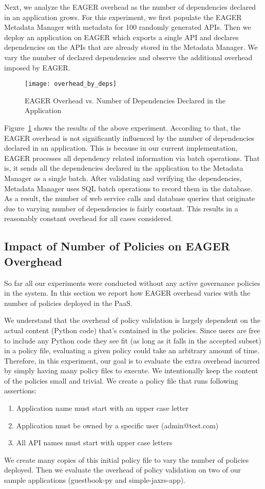 Next, we analyze the EAGER overhead as the number of dependencies declared in an application grows. For this experiment, we first populate 
the EAGER Metadata Manager with metadata for 100 randomly generated APIs. Then we deploy an application on EAGER which exports a single
API and declares dependencies on the APIs that are already stored in the Metadata Manager. We vary the number of declared dependencies and
observe the additional overhead imposed by EAGER.

\begin{figure}
\centering
\texttt{[image: overhead\_by\_deps]}
\caption{EAGER Overhead vs. Number of Dependencies Declared in the Application}
\label{fig:overhead_by_deps}
\end{figure}

Figure~\ref{fig:overhead_by_deps} shows the results of the above experiment. According to that, the EAGER overhead is not significantly
influenced by the number of dependencies declared in an application. This is because in our current implementation, EAGER processes
all dependency related information via batch operations. That is, it sends all the dependencies declared in the application to the Metadata
Manager as a single batch. After validating and verifying the dependencies, Metadata Manager uses SQL batch operations to record
them in the database. As a result, the number of web service calls and database queries that originate due to varying number of dependencies
is fairly constant. This results in a reasonably constant overhead for all cases considered.

\subsection{Impact of Number of Policies on EAGER Overghead}

So far all our experiments were conducted without any active governance policies in the system. In this section we report how EAGER overhead
varies with the number of policies deployed in the PaaS. 

We understand that the overhead of policy validation is largely dependent
on the actual content (Python code) that's contained in the policies. Since users are free to include any Python code they see fit (as long as it
falls in the accepted subset) in a policy file, evaluating a given policy could take an arbitrary amount of time. Therefore, in this experiment, our
goal is to evaluate the extra overhead incurred by simply having many policy files to execute. We intentionally keep the content of the policies
small and trivial. We create a policy file that runs following assertions:
\begin{enumerate}
\item Application name must start with an upper case letter
\item Application must be owned by a specific user (admin@test.com)
\item All API names must start with upper case letters
\end{enumerate}
We create many copies of this initial policy file to vary the number of policies deployed. Then we evaluate the overhead of policy validation
on two of our sample applications (guestbook-py and simple-jaxrs-app). 

